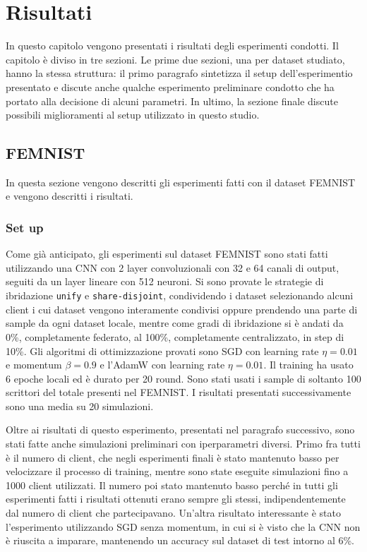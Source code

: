 \chapter{Risultati}
In questo capitolo vengono presentati i risultati degli esperimenti 
condotti. Il capitolo è diviso in tre sezioni.
Le prime due sezioni, una per dataset studiato, hanno la stessa 
struttura: il primo paragrafo sintetizza il 
setup dell'esperimentio presentato e discute anche qualche esperimento
preliminare condotto che ha portato alla decisione di alcuni parametri.
In ultimo, la sezione finale discute possibili miglioramenti al setup
utilizzato in questo studio.


\section{FEMNIST}
In questa sezione vengono descritti gli esperimenti fatti con il dataset
FEMNIST e vengono descritti i risultati.

\subsection{Set up}
Come già anticipato, gli esperimenti sul dataset FEMNIST sono stati fatti 
utilizzando una CNN con 2 layer convoluzionali con 32 e 64 canali di 
output, seguiti da un layer lineare con 512 neuroni. Si sono provate le 
strategie di ibridazione \texttt{unify} e \texttt{share-disjoint},
condividendo i dataset selezionando alcuni client i cui dataset 
vengono interamente condivisi oppure prendendo una parte di sample da 
ogni dataset locale, mentre come gradi di ibridazione si è andati da 0\%,
completamente federato, al 100\%, completamente centralizzato,
in step di 10\%. Gli algoritmi di ottimizzazione provati sono SGD 
con learning rate \(\eta = 0.01\) e momentum \(\beta = 0.9\) e l'AdamW
con learning rate \(\eta = 0.01\). Il training ha usato 6 epoche locali
ed è durato per 20 round. Sono stati usati i sample di soltanto 100 
scrittori del totale presenti nel FEMNIST. I risultati presentati 
successivamente sono una media su 20 simulazioni.

Oltre ai risultati di questo esperimento, presentati nel paragrafo
successivo, sono stati fatte anche simulazioni preliminari con 
iperparametri diversi. Primo fra tutti è il numero di client, che negli 
esperimenti finali è stato mantenuto basso per velocizzare il processo 
di training, mentre sono state eseguite simulazioni fino a 1000 client 
utilizzati. Il numero poi stato mantenuto basso perché in tutti gli 
esperimenti fatti i risultati ottenuti erano sempre gli stessi, 
indipendentemente dal numero di client che partecipavano.
Un'altra risultato interessante è stato l'esperimento utilizzando SGD
senza momentum, in cui si è visto che la CNN non è riuscita a imparare,
mantenendo un accuracy sul dataset di test intorno al 6\%.

